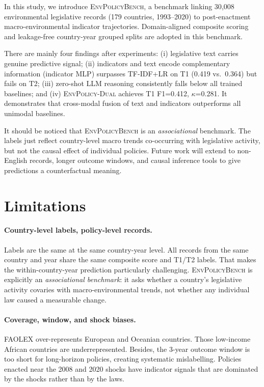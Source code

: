 \documentclass[11pt]{article}
\newcommand{\ours}{\textsc{EnvPolicy-Dual}}
\newcommand{\bench}{\textsc{EnvPolicyBench}}
\begin{document}
In this study, we introduce \bench, a benchmark linking 30{,}008 environmental legislative records (179 countries, 1993--2020) to post-enactment macro-environmental indicator trajectories. Domain-aligned composite scoring and leakage-free country-year grouped splits are adopted in this benchmark.

There are mainly four findings after experiments: (i) legislative text carries genuine predictive signal; (ii) indicators and text encode complementary information (indicator MLP) surpasses TF-IDF+LR on T1 (0.419 vs.\ 0.364) but fails on T2; (iii) zero-shot LLM reasoning consistently falls below all trained baselines; and (iv) \ours{} achieves T1 F1=0.412, $\kappa$=0.281. It demonstrates that cross-modal fusion of text and indicators outperforms all unimodal baselines.

It should be noticed that \bench{} is an \emph{associational} benchmark. The labels just reflect country-level macro trends co-occurring with legislative activity, but not the causal effect of individual policies. Future work will extend to non-English records, longer outcome windows, and causal inference tools to give predictions a counterfactual meaning.

\section*{Limitations}
\label{sec:lim}

\paragraph{Country-level labels, policy-level records.}
Labels are the same at the same country-year level. All records from the same country and year share the same composite score and T1/T2 labels. That makes the within-country-year prediction particularly challenging. 
\bench{} is explicitly an \emph{associational benchmark}: it asks whether a country's legislative activity covaries with macro-environmental trends, not whether any individual law caused a measurable change.

\paragraph{Coverage, window, and shock biases.}
FAOLEX over-represents European and Oceanian countries. Those low-income African countries are underrepresented. Besides, the 3-year outcome window is too short for long-horizon policies, creating systematic mislabelling. Policies enacted near the 2008 and 2020 shocks have indicator signals that are dominated by the shocks rather than by the laws.
\end{document}
